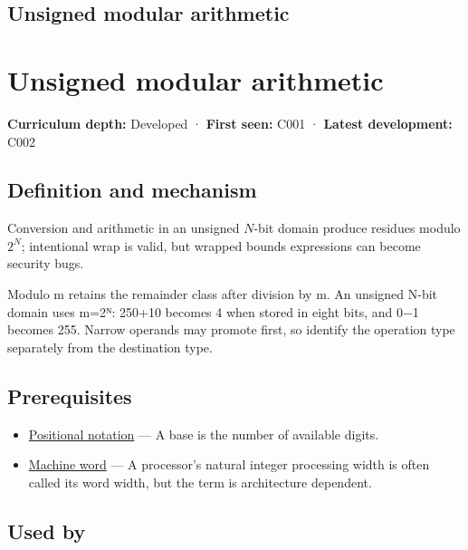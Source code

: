 \hypertarget{appendix-c99977d88b33}{}
\section*{Unsigned modular arithmetic}
\chapter{Unsigned modular arithmetic}\label{appendix-c99977d88b33-unsigned-modular-arithmetic}

\textbf{Curriculum depth:} Developed · \textbf{First seen:} C001 · \textbf{Latest development:} C002

\section{Definition and mechanism}\label{appendix-c99977d88b33-definition-and-mechanism}

Conversion and arithmetic in an unsigned \(N\)-bit domain produce residues modulo \(2^N\); intentional wrap is valid, but wrapped bounds expressions can become security bugs.

Modulo m retains the remainder class after division by m. An unsigned N-bit domain uses m=2ᴺ: 250+10 becomes 4 when stored in eight bits, and 0−1 becomes 255. Narrow operands may promote first, so identify the operation type separately from the destination type.

\section{Prerequisites}\label{appendix-c99977d88b33-prerequisites}

\begin{itemize}
\tightlist
\item
  \hyperref[appendix-83c3f28f7bda]{Positional notation} --- A base is the number of available digits.
\item
  \hyperref[appendix-d67a19507dc5]{Machine word} --- A processor's natural integer processing width is often called its word width, but the term is architecture dependent.
\end{itemize}

\section{Used by}\label{appendix-c99977d88b33-used-by}

